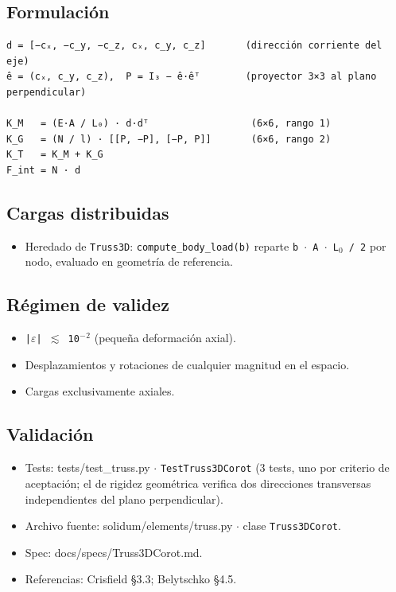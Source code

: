 \documentclass[11pt,letterpaper,oneside]{report}
\begin{document}
\subsection{Formulación}
\begin{lstlisting}
d = [−cₓ, −c_y, −c_z, cₓ, c_y, c_z]       (dirección corriente del eje)
ê = (cₓ, c_y, c_z),  P = I₃ − ê·êᵀ        (proyector 3×3 al plano perpendicular)

K_M   = (E·A / L₀) · d·dᵀ                  (6×6, rango 1)
K_G   = (N / l) · [[P, −P], [−P, P]]       (6×6, rango 2)
K_T   = K_M + K_G
F_int = N · d

\end{lstlisting}

\subsection{Cargas distribuidas}
\begin{itemize}
  \item Heredado de \texttt{Truss3D}: \texttt{compute\_body\_load(b)} reparte \texttt{b \ensuremath{\cdot} A \ensuremath{\cdot} L\ensuremath{_{0}} / 2} por nodo, evaluado en geometría de referencia.
\end{itemize}

\subsection{Régimen de validez}
\begin{itemize}
  \item \texttt{|\ensuremath{\varepsilon}| \ensuremath{\lesssim} 10\ensuremath{^{-}}\ensuremath{^{2}}} (pequeña deformación axial).
  \item Desplazamientos y rotaciones de cualquier magnitud en el espacio.
  \item Cargas exclusivamente axiales.
\end{itemize}

\subsection{Validación}
\begin{itemize}
  \item Tests: tests/test\_truss.py \ensuremath{\cdot} \texttt{TestTruss3DCorot} (3 tests, uno por criterio de aceptación; el de rigidez geométrica verifica dos direcciones transversas independientes del plano perpendicular).
  \item Archivo fuente: solidum/elements/truss.py \ensuremath{\cdot} clase \texttt{Truss3DCorot}.
  \item Spec: docs/specs/Truss3DCorot.md.
  \item Referencias: Crisfield §3.3; Belytschko §4.5.
\end{itemize}
\end{document}
